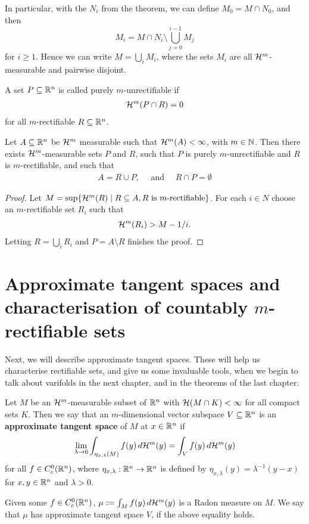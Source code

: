 In particular, with the $N_i$ from the theorem, we can define $M_0 = M \cap N_0$, and then
\[
    M_i = M \cap N_i \setminus \bigcup_{j=0}^{i-1}M_j
\]
for $i \ge 1$. Hence we can write $M = \bigcup_i M_i$, where the sets $M_i$ are all $\mathcal{H}^m$-measurable and pairwise disjoint.

\begin{definition}
A set $P \subseteq \mathbb{R}^n$ is called purely $m$-unrectifiable if
\begin{align*}
    \mathcal{H}^m(P \cap R)=0
\end{align*}
for all $m$-rectifiable $R \subseteq \mathbb{R}^n$.
\end{definition}

\begin{theorem}
Let $A \subseteq \mathbb{R}^n$ be $\mathcal{H}^m$ measurable such that $\mathcal{H}^m(A) < \infty$, with $m \in \mathbb{N}$. Then there exists $\mathcal{H}^m$-measurable sets $P$ and $R$, such that $P$ is purely $m$-unrectifiable and $R$ is $m$-rectifiable, and such that
\begin{align*}
    A = R \cup P, \quad \text{ and }\quad R \cap P = \emptyset
\end{align*}
\end{theorem}
\begin{proof}
Let $M = \sup\{\mathcal{H}^m(R) \mid R \subseteq A, R \text{ is } m\text{-rectifiable}\}$. For each $i \in N$ choose an $m$-rectifiable set $R_i$ such that
\begin{align*}
    \mathcal{H}^m(R_i) > M-1/i.
\end{align*}
Letting $R = \bigcup_i R_i$ and $P = A \setminus R$ finishes the proof.
\end{proof}

\section{Approximate tangent spaces and characterisation of countably $m$-rectifiable sets}

Next, we will describe approximate tangent spaces. These will help us characterise rectifiable sets, and give us some invaluable tools, when we begin to talk about varifolds in the next chapter, and in the theorems of the last chapter.

\begin{definition}
Let $M$ be an $\mathcal{H}^m$-measurable subset of $\mathbb{R}^n$ with $\mathcal{H}(M \cap K) < \infty$ for all compact sets $K$. Then we say that an $m$-dimensional vector subspace $V \subseteq \mathbb{R}^n$ is an \textbf{approximate tangent space} of $M$ at $x \in \mathbb{R}^{n}$ if
\[
    \lim_{\lambda \to 0} \int_{\eta_{x,\lambda}(M)}f(y)\, d\mathcal{H}^m(y) = \int_V f(y) \, d\mathcal{H}^m(y)
\]
for all $f \in C_c^0(\mathbb{R}^n)$, where $\eta_{x,\lambda}:\mathbb{R}^n \to \mathbb{R}^n$ is defined by $\eta_{x,\lambda}(y)=\lambda^{-1}(y-x)$ for $x,y \in \mathbb{R}^n$ and $\lambda > 0$.
\end{definition}
Given some $f \in C_c^0(\mathbb{R}^n)$, $\mu:=\int_Mf(y)\, d\mathcal{H}^m(y)$ is a Radon measure on $M$. We say that $\mu$ has approximate tangent space $V$, if the above equality holds.

